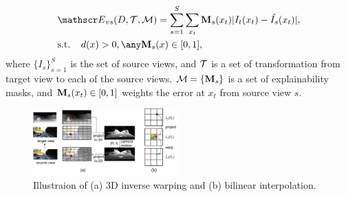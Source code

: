 \begin{align}
\label{eqn:warp}
&\scr{E}_{vs}(D, \hua{T}, \hua{M}) = \sum_{s=1}^{S}\sum_{x_t}\ve{M}_s(x_t)|I_t(x_t) - \hat{I_s}(x_t)|, \nonumber \\
&\text{s.t. ~~} d(x) > 0, \any \ve{M}_s(x)\in [0, 1],
\end{align}
where $\{I_s\}_{s=1}^{S}$ is the set of source views, and ${\mathcal T}$ is a set of transformation from target view to each of the source views. 
${\mathcal M} = \{{\mathbf M}_s\}$ is a set of explainability masks, and ${\mathbf M}_s(x_t) \in [0, 1]$ weights the error at $x_t$ from source view $s$.

\begin{figure}
\centering
\includegraphics[width=0.5\textwidth]{figures/3d_warping.pdf}
\caption{Illustraion of (a) 3D inverse warping and (b) bilinear interpolation.}
\label{fig:3d_warping}
\end{figure}


